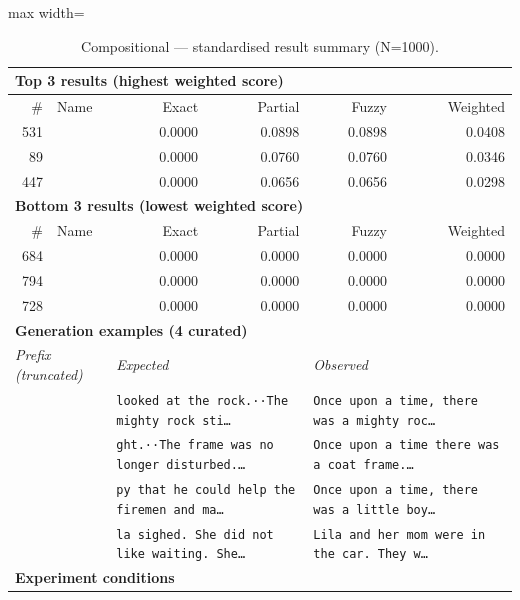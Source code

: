 \begin{table}[htbp]
\centering
\caption{Compositional — standardised result summary (N=1000).}
\label{tab:compositional_summary}
\begin{adjustbox}{max width=\textwidth}
\begin{tabular}{r p{5cm} r r r r}
\toprule
\multicolumn{6}{l}{\textbf{Top 3 results (highest weighted score)}} \\
\midrule
\# & Name & Exact & Partial & Fuzzy & Weighted \\
\midrule
531 &  & 0.0000 & 0.0898 & 0.0898 & 0.0408 \\
89 &  & 0.0000 & 0.0760 & 0.0760 & 0.0346 \\
447 &  & 0.0000 & 0.0656 & 0.0656 & 0.0298 \\
\midrule
\multicolumn{6}{l}{\textbf{Bottom 3 results (lowest weighted score)}} \\
\midrule
\# & Name & Exact & Partial & Fuzzy & Weighted \\
\midrule
684 &  & 0.0000 & 0.0000 & 0.0000 & 0.0000 \\
794 &  & 0.0000 & 0.0000 & 0.0000 & 0.0000 \\
728 &  & 0.0000 & 0.0000 & 0.0000 & 0.0000 \\
\midrule
\multicolumn{6}{l}{\textbf{Generation examples (4 curated)}} \\
\midrule
\multicolumn{2}{l}{\textit{Prefix (truncated)}} & \multicolumn{2}{l}{\textit{Expected}} & \multicolumn{2}{l}{\textit{Observed}} \\
\midrule
\multicolumn{2}{l}{\texttt{}} & \multicolumn{2}{l}{\texttt{looked at the rock.··The mighty rock sti\ldots}} & \multicolumn{2}{l}{\texttt{Once upon a time, there was a mighty roc\ldots}} \\
\multicolumn{2}{l}{\texttt{}} & \multicolumn{2}{l}{\texttt{ght.··The frame was no longer disturbed.\ldots}} & \multicolumn{2}{l}{\texttt{Once upon a time there was a coat frame.\ldots}} \\
\multicolumn{2}{l}{\texttt{}} & \multicolumn{2}{l}{\texttt{py that he could help the firemen and ma\ldots}} & \multicolumn{2}{l}{\texttt{Once upon a time, there was a little boy\ldots}} \\
\multicolumn{2}{l}{\texttt{}} & \multicolumn{2}{l}{\texttt{la sighed. She did not like waiting. She\ldots}} & \multicolumn{2}{l}{\texttt{Lila and her mom were in the car. They w\ldots}} \\
\midrule
\multicolumn{6}{l}{\textbf{Experiment conditions}} \\

\end{tabular}
\end{adjustbox}
\end{table}
